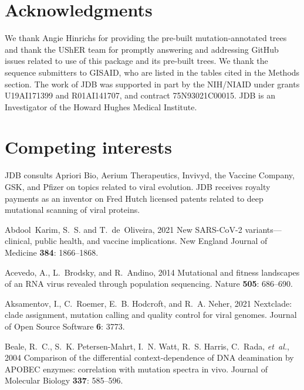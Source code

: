 \documentclass[9pt,twocolumn,twoside]{gsajnl_modified}
\begin{document}
{\section{Acknowledgments}
We thank Angie Hinrichs for providing the pre-built mutation-annotated trees and thank the UShER team for promptly answering and addressing GitHub issues related to use of this package and its pre-built trees.
We thank the sequence submitters to GISAID, who are listed in the tables cited in the Methods section.
The work of JDB was supported in part by the NIH/NIAID under grants U19AI171399 and R01AI141707, and contract 75N93021C00015.
JDB is an Investigator of the Howard Hughes Medical Institute.

\section{Competing interests}
JDB consults Apriori Bio, Aerium Therapeutics, Invivyd, the Vaccine Company, GSK, and Pfizer on topics related to viral evolution.
JDB receives royalty payments as an inventor on Fred Hutch licensed patents related to deep mutational scanning of viral proteins.

\begin{thebibliography}{76}

{Abdool~Karim, S.~S. {\rm and} T.~de~Oliveira}, 2021 New {SARS-CoV-2}
  variants—clinical, public health, and vaccine implications. New England
  Journal of Medicine {\bf 384}: 1866--1868.

{Acevedo, A., L.~Brodsky, {\rm and} R.~Andino}, 2014 Mutational and fitness
  landscapes of an {RNA} virus revealed through population sequencing. Nature
  {\bf 505}: 686--690.

{Aksamentov, I., C.~Roemer, E.~B. Hodcroft, {\rm and} R.~A. Neher}, 2021
  Nextclade: clade assignment, mutation calling and quality control for viral
  genomes. Journal of Open Source Software {\bf 6}: 3773.

{Beale, R.~C., S.~K. Petersen-Mahrt, I.~N. Watt, R.~S. Harris, C.~Rada, {\em
  et~al.\/}}, 2004 {Comparison of the differential context-dependence of DNA
  deamination by APOBEC enzymes: correlation with mutation spectra in vivo}.
  Journal of Molecular Biology {\bf 337}: 585--596.


\end{thebibliography}}
\end{document}
